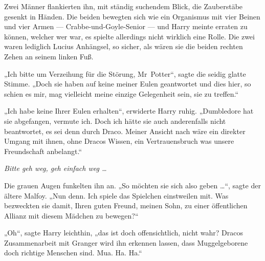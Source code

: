 Zwei Männer flankierten ihn, mit ständig suchendem Blick, die Zauberstäbe gesenkt in Händen. Die beiden bewegten sich wie ein Organismus mit vier Beinen und vier Armen — Crabbe-und-Goyle-Senior — und Harry meinte erraten zu können, welcher wer war, es spielte allerdings nicht wirklich eine Rolle. Die zwei waren lediglich Lucius Anhängsel, so sicher, als wären sie die beiden rechten Zehen an seinem linken Fuß.

„Ich bitte um Verzeihung für die Störung, Mr~Potter“, sagte die seidig glatte Stimme.
„Doch sie haben auf keine meiner Eulen geantwortet und dies hier, so schien es mir, mag vielleicht meine einzige Gelegenheit sein, sie zu treffen.“

„Ich habe keine Ihrer Eulen erhalten“, erwiderte Harry ruhig.
„Dumbledore hat sie abgefangen, vermute ich. Doch ich hätte sie auch anderenfalls nicht beantwortet, es sei denn durch Draco. Meiner Ansicht nach wäre ein direkter Umgang mit ihnen, ohne Dracos Wissen, ein Vertrauensbruch was unsere Freundschaft anbelangt.“

\emph{Bitte geh weg, geh einfach weg …}

Die grauen Augen funkelten ihn an.
„So möchten sie sich also geben …“, sagte der ältere Malfoy.
„Nun denn. Ich spiele das Spielchen einstweilen mit. Was bezweckten sie damit, Ihren guten Freund, meinen Sohn, zu einer öffentlichen Allianz mit diesem Mädchen zu bewegen?“

„Oh“, sagte Harry leichthin, „das ist doch offensichtlich, nicht wahr? Dracos Zusammenarbeit mit Granger wird ihn erkennen lassen, dass Muggelgeborene doch richtige Menschen sind. Mua. Ha. Ha.“

